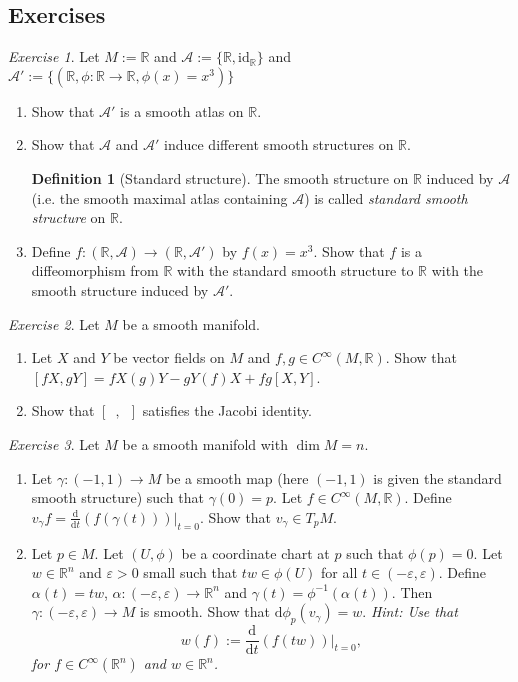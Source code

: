 \documentclass[12pt]{amsart}
\numberwithin{equation}{section}
\theoremstyle{plain}
\theoremstyle{definition}
\newtheorem{defn}{Definition}[subsection]
\theoremstyle{remark}
\newtheorem{exe}{Exercise}[subsection]
\newcommand{\R}{\mathbb{R}}
\newcommand{\dd}{{\mathrm{d}}}
\newcommand{\id}{\mathrm{id}}
\newcommand{\calA}{\mathcal{A}}
\begin{document}
\subsection{Exercises}

\begin{exe}
Let $M:=\R$ and $\calA:=\{\R,\id_\R\}$ and $\calA':=\{(\R,\phi\colon\R\to\R,\phi(x)=x^3)\}$ 
\begin{enumerate}
\item{Show that $\calA'$ is a smooth atlas on $\R$.
}
\item{Show that $\calA$ and $\calA'$ induce different smooth structures on $\R$.
}
\begin{defn}[Standard structure]
The smooth structure on $\R$ induced by $\calA$ (i.e. the smooth maximal atlas containing $\calA$) is called \emph{standard smooth structure} on $\R$.
\end{defn}
\item{
Define $f\colon (\R,\calA)\to(\R,\calA')$ by $f(x)=x^3$. Show that $f$ is a diffeomorphism from $\R$ with the standard smooth structure to $\R$ with the smooth structure induced by $\calA'$.

}
\end{enumerate}
\end{exe}


\begin{exe}
Let $M$ be a smooth manifold. 
\begin{enumerate}
\item{Let $X$ and $Y$ be vector fields on $M$ and $f,g\in C^\infty(M,\R)$. Show that $[fX,gY]=fX(g)Y-gY(f)X+fg[X,Y]$.
}
\item{Show that $[\enspace,\enspace]$ satisfies the Jacobi identity.}
\end{enumerate}
\end{exe}

\begin{exe}
Let $M$ be a smooth manifold with $\dim M=n$.
\begin{enumerate}
\item{Let $\gamma\colon (-1,1)\to M$ be a smooth map (here $(-1,1)$ is given the standard smooth structure) such that $\gamma(0)=p$. Let $f\in C^\infty(M,\R)$. Define $v_\gamma f=\frac{\dd}{\dd t}(f(\gamma(t)))\big|_{t=0}$. Show that $v_\gamma\in T_pM$.
}
\item{Let $p\in M$. Let $(U,\phi)$ be a coordinate chart at $p$ such that $\phi(p)=0$. Let $w\in\R^n$ and $\varepsilon>0$ small such that $tw\in\phi(U)$ for all $t\in (-\varepsilon,\varepsilon)$. Define $\alpha(t)=tw$, $\alpha\colon (-\varepsilon,\varepsilon)\to\R^n$ and $\gamma(t)=\phi^{-1}(\alpha(t))$. Then $\gamma\colon(-\varepsilon,\varepsilon)\to M$ is smooth. Show that $\dd\phi_p(v_\gamma)=w$. \emph{Hint: Use that
$$w(f):=\frac{\dd}{\dd t}(f(tw))\big|_{t=0},$$
for $f\in C^\infty(\R^n)$ and $w\in\R^n$.
} 
}
\end{enumerate}
\end{exe}
\end{document}
